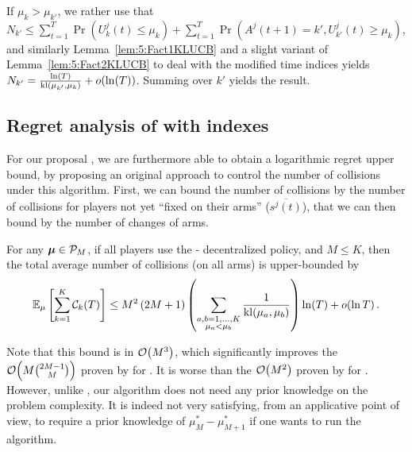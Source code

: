 \begin{smallproof}
  If $\mu_k > \mu_{k'}$, we rather use that
  $N_{k'} \leq \sum\limits_{t=1}^T \Pr\left(U_{k}^j(t) \leq \mu_{k}\right) + \sum\limits_{t=1}^T \Pr\left(A^j(t+1) = k', U_{k'}^j(t) \geq \mu_{k}\right)$,
  and similarly Lemma~\ref{lem:5:Fact1KLUCB} and a slight variant of Lemma~\ref{lem:5:Fact2KLUCB} to deal with the modified time indices yields
  $N_{k'} = \frac{\ln(T)}{\mathrm{kl}(\mu_{k'},\mu_{k})} + o(\ln(T))$.
  Summing over $k'$ yields the result.
\end{smallproof}


\subsection{Regret analysis of \MCTopM{} with \klUCB{} indexes}\label{sub:5:UpperBoundCollisions}

For our proposal \MCTopM, we are furthermore able to obtain a logarithmic regret upper bound, by proposing an original approach to control the number of collisions under this algorithm.
First, we can bound the number of collisions by the number of collisions for players not yet ``fixed on their arms'' ($\overline{s^j(t)}$),
that we can then bound by the number of changes of arms.

\begin{lemma}\label{lem:5:collisionsMCTopM}
\begin{leftbar}[lemmabar]  %
  For any $\boldsymbol{\mu}\in\mathcal{P}_M$,
  if all players use the
  \MCTopM-\klUCB{} decentralized policy,
  and $M \leq K$,
  then the total average number of collisions (on all arms)
  is upper-bounded by
  \begin{equation}
    \mathbb{E}_{\mu}\left[\sum_{k=1}^K \mathcal{C}_k(T)\right]
    \leq M^2\left(2 M + 1\right) \left(\sum_{\substack{a,b=1,\dots,K\\\mu_a < \mu_b}} \frac{1}{\mathrm{kl}(\mu_a,\mu_b)}\right) \ln(T) + \mathop{}\mathopen{}o\mathopen{}\left(\ln T\right).
  \end{equation}
\end{leftbar}  %
\end{lemma}

Note that this bound is in $\mathop{}\mathopen{}\mathcal{O}\mathopen{}\left(M^3\right)$,
which significantly improves the $\mathop{}\mathopen{}\mathcal{O}\mathopen{}\left(M{2M-1 \choose M}\right)$ proven by \cite{Anandkumar11} for \rhoRand. It is worse than the $\mathop{}\mathopen{}\mathcal{O}\mathopen{}\left(M^2\right)$ proven by \cite{Rosenski16} for \MusicalChair{}. %
However, unlike \MusicalChair, our algorithm does not need any prior knowledge on the problem complexity.
It is indeed not very satisfying, from an applicative point of view, to require a prior knowledge
of $\mu^*_{M}-\mu^*_{M+1}$ if one wants to run the \MusicalChair{} algorithm.

